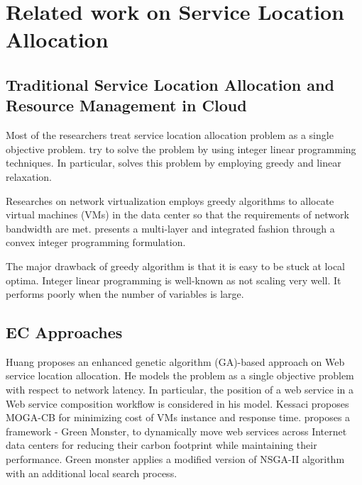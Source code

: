 
\section{Related work on Service Location Allocation}
\subsection{Traditional Service Location Allocation and Resource Management in Cloud}
\label{sec:drawbacks}
Most of the researchers treat service 
location allocation problem as a single objective problem. \cite{Aboolian, Sun} try to solve the problem by using integer linear programming techniques.
In particular, \cite{Sun} solves this problem by employing greedy and linear relaxation.

Researches on network virtualization \cite{export:149565,export:141114} employs greedy algorithms to allocate virtual machines (VMs) in 
the data center so that the requirements of network bandwidth are met. \cite{6217521} presents
a multi-layer and integrated fashion through a convex integer programming formulation.

The major drawback of greedy algorithm is that it is easy to be stuck at local optima. Integer linear programming
is well-known as not scaling very well. It performs poorly when the number of variables is large.



\subsection{EC Approaches}
Huang \cite{EnhancedGenetic} proposes an enhanced genetic algorithm (GA)-based approach on Web service location allocation. 
He models the problem as a single objective problem with respect to network latency. 
In particular, the position of a web service in a Web service composition workflow is considered in his model.
Kessaci \cite{6557869} proposes MOGA-CB for minimizing cost of VMs instance and response time.
\cite{Phan8} proposes a framework - Green Monster, to dynamically move web services across Internet data centers for reducing 
their carbon footprint while maintaining their performance. Green monster applies a modified version of NSGA-II algorithm \cite{996017}
with an additional local search process.


